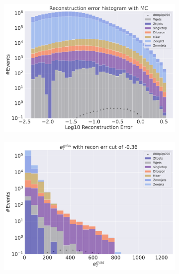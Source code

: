 \begin{figure}[H]
    \centering
    \begin{subfigure}{.40\textwidth}
        \includegraphics[width=\textwidth]{Figures/VAE_testing/big/2lep/b_data_recon_big_rm3_feats_sig_800p0p050_.pdf}
        \caption{ }
        \label{fig:VAE_2lep_big_800_3}
    \end{subfigure}
    \hfill
    \begin{subfigure}{.40\textwidth}
        \includegraphics[width=\textwidth]{Figures/VAE_testing/big/2lep/b_data_recon_big_rm3_feats_sig_800p0p050_recon_errcut_-0.36.pdf}
        \caption{}
        \label{fig:VAE_2lep_big_etmiss_800_3}
    \end{subfigure}
    \hfill
      

\end{figure}
